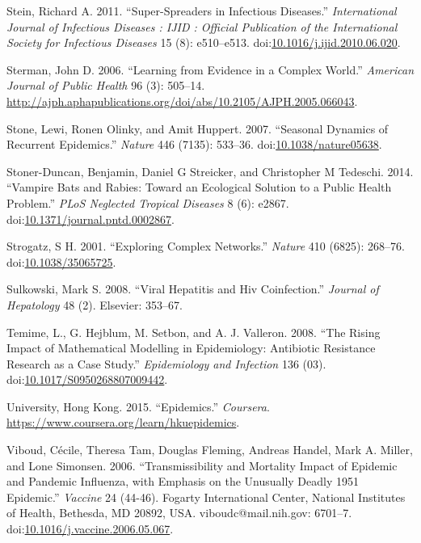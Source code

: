\documentclass[]{book}
\theoremstyle{definition}
\theoremstyle{definition}
\theoremstyle{definition}
\theoremstyle{remark}
\begin{document}
\hypertarget{ref-stein11}{}
Stein, Richard A. 2011. ``Super-Spreaders in Infectious Diseases.''
\emph{International Journal of Infectious Diseases : IJID : Official
Publication of the International Society for Infectious Diseases} 15
(8): e510--e513.
doi:\href{https://doi.org/10.1016/j.ijid.2010.06.020}{10.1016/j.ijid.2010.06.020}.

\hypertarget{ref-sterman06}{}
Sterman, John D. 2006. ``Learning from Evidence in a Complex World.''
\emph{American Journal of Public Health} 96 (3): 505--14.
\url{http://ajph.aphapublications.org/doi/abs/10.2105/AJPH.2005.066043}.

\hypertarget{ref-stone07}{}
Stone, Lewi, Ronen Olinky, and Amit Huppert. 2007. ``Seasonal Dynamics
of Recurrent Epidemics.'' \emph{Nature} 446 (7135): 533--36.
doi:\href{https://doi.org/10.1038/nature05638}{10.1038/nature05638}.

\hypertarget{ref-stoner-duncan14}{}
Stoner-Duncan, Benjamin, Daniel G Streicker, and Christopher M Tedeschi.
2014. ``Vampire Bats and Rabies: Toward an Ecological Solution to a
Public Health Problem.'' \emph{PLoS Neglected Tropical Diseases} 8 (6):
e2867.
doi:\href{https://doi.org/10.1371/journal.pntd.0002867}{10.1371/journal.pntd.0002867}.

\hypertarget{ref-strogatz01}{}
Strogatz, S H. 2001. ``Exploring Complex Networks.'' \emph{Nature} 410
(6825): 268--76.
doi:\href{https://doi.org/10.1038/35065725}{10.1038/35065725}.

\hypertarget{ref-sulkowski08}{}
Sulkowski, Mark S. 2008. ``Viral Hepatitis and Hiv Coinfection.''
\emph{Journal of Hepatology} 48 (2). Elsevier: 353--67.

\hypertarget{ref-temime08}{}
Temime, L., G. Hejblum, M. Setbon, and A. J. Valleron. 2008. ``The
Rising Impact of Mathematical Modelling in Epidemiology: Antibiotic
Resistance Research as a Case Study.'' \emph{Epidemiology and Infection}
136 (03).
doi:\href{https://doi.org/10.1017/S0950268807009442}{10.1017/S0950268807009442}.

\hypertarget{ref-hkepidemics}{}
University, Hong Kong. 2015. ``Epidemics.'' \emph{Coursera}.
\url{https://www.coursera.org/learn/hkuepidemics}.

\hypertarget{ref-viboud06}{}
Viboud, Cécile, Theresa Tam, Douglas Fleming, Andreas Handel, Mark A.
Miller, and Lone Simonsen. 2006. ``Transmissibility and Mortality Impact
of Epidemic and Pandemic Influenza, with Emphasis on the Unusually
Deadly 1951 Epidemic.'' \emph{Vaccine} 24 (44-46). Fogarty International
Center, National Institutes of Health, Bethesda, MD 20892, USA.
viboudc@mail.nih.gov: 6701--7.
doi:\href{https://doi.org/10.1016/j.vaccine.2006.05.067}{10.1016/j.vaccine.2006.05.067}.
\end{document}
